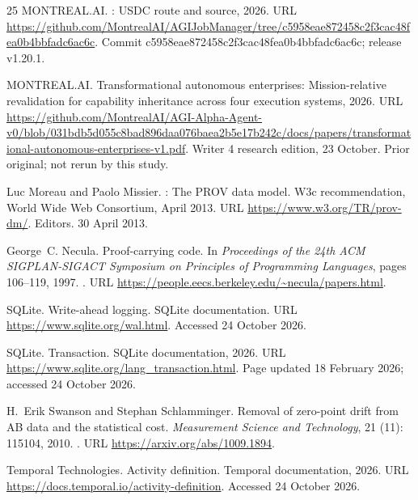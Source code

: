 \documentclass[11pt]{article}
\begin{document}
\begin{thebibliography}{25}
{MONTREAL.AI}.
: {USDC} route and source, 2026{}.
\newblock URL
  \url{https://github.com/MontrealAI/AGIJobManager/tree/c5958eae872458c2f3cac48fea0b4bbfadc6ac6c}.
\newblock Commit c5958eae872458c2f3cac48fea0b4bbfadc6ac6c; release v1.20.1.

{MONTREAL.AI}.
\newblock Transformational autonomous enterprises: Mission-relative
  revalidation for capability inheritance across four execution systems,
  2026{}.
\newblock URL
  \url{https://github.com/MontrealAI/AGI-Alpha-Agent-v0/blob/031bdb5d055c8bad896daa076baea2b5e17b242c/docs/papers/transformational-autonomous-enterprises-v1.pdf}.
\newblock Writer 4 research edition, 23 October. Prior original; not rerun by
  this study.

Luc Moreau and Paolo Missier.
: The {PROV} data model.
\newblock W3c recommendation, World Wide Web Consortium, April 2013.
\newblock URL \url{https://www.w3.org/TR/prov-dm/}.
\newblock Editors. 30 April 2013.

George~C. Necula.
\newblock Proof-carrying code.
\newblock In \emph{Proceedings of the 24th ACM SIGPLAN-SIGACT Symposium on
  Principles of Programming Languages}, pages 106--119, 1997.
\newblock {}.
\newblock URL \url{https://people.eecs.berkeley.edu/~necula/papers.html}.

{SQLite}.
\newblock Write-ahead logging.
\newblock SQLite documentation.
\newblock URL \url{https://www.sqlite.org/wal.html}.
\newblock Accessed 24 October 2026.

{SQLite}.
\newblock Transaction.
\newblock SQLite documentation, 2026.
\newblock URL \url{https://www.sqlite.org/lang_transaction.html}.
\newblock Page updated 18 February 2026; accessed 24 October 2026.

H.~Erik Swanson and Stephan Schlamminger.
\newblock Removal of zero-point drift from {AB} data and the statistical cost.
\newblock \emph{Measurement Science and Technology}, 21 (11):
  115104, 2010.
\newblock {}.
\newblock URL \url{https://arxiv.org/abs/1009.1894}.

{Temporal Technologies}.
\newblock Activity definition.
\newblock Temporal documentation, 2026.
\newblock URL \url{https://docs.temporal.io/activity-definition}.
\newblock Accessed 24 October 2026.

\end{thebibliography}
\end{document}
